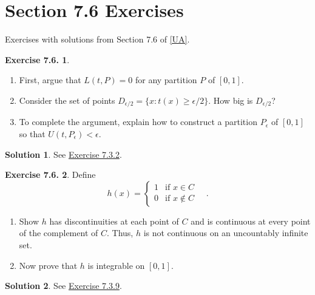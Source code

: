 \documentclass[12pt]{article}
\theoremstyle{definition}
\theoremstyle{exercise}
\newtheorem{exercise}{Exercise 7.6.}
\theoremstyle{solution}
\newtheorem*{solution}{Solution}
\begin{document}
\section{Section 7.6 Exercises}

Exercises with solutions from Section 7.6 of \hyperlink{ua}{[UA]}.

\begin{exercise}
\label{ex:1}
    \begin{enumerate}
        \item First, argue that \( L(t, P) = 0 \) for any partition \( P \) of \( [0, 1] \).

        \item Consider the set of points \( D_{\epsilon/2} = \{ x : t(x) \geq \epsilon/2 \} \). How big is \( D_{\epsilon/2} \)?

        \item To complete the argument, explain how to construct a partition \( P_{\epsilon} \) of \( [0, 1] \) so that \( U(t, P_{\epsilon}) < \epsilon \).
    \end{enumerate}
\end{exercise}

\begin{solution}
    See \href{https://lew98.github.io/Mathematics/UA_Section_7_3_Exercises.pdf}{Exercise 7.3.2}.
\end{solution}

\begin{exercise}
\label{ex:2}
    Define
    \[
        h(x) = \begin{cases}
            1 & \text{if } x \in C \\
            0 & \text{if } x \not\in C
        \end{cases} \quad .
    \]
    \begin{enumerate}
        \item Show \( h \) has discontinuities at each point of \( C \) and is continuous at every point of the complement of \( C \). Thus, \( h \) is not continuous on an uncountably infinite set.

        \item Now prove that \( h \) is integrable on \( [0, 1] \).
    \end{enumerate}
\end{exercise}

\begin{solution}
    See \href{https://lew98.github.io/Mathematics/UA_Section_7_3_Exercises.pdf}{Exercise 7.3.9}.
\end{solution}
\end{document}

